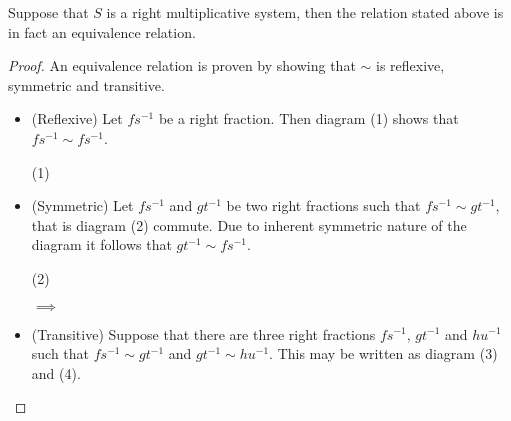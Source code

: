     \begin{prop}
        Suppose that $S$ is a right multiplicative system, then the relation stated above is in fact an equivalence relation.
    \end{prop}

    \begin{proof}
        An equivalence relation is proven by showing that $\sim$ is reflexive, symmetric and transitive.
        \begin{itemize}
            \item (Reflexive) Let $fs^{-1}$ be a right fraction. Then diagram (1) shows that $fs^{-1}\sim fs^{-1}$.
            \begin{center} (1)
            \end{center}
            \item (Symmetric) Let $fs^{-1}$ and $gt^{-1}$ be two right fractions such that $fs^{-1}\sim gt^{-1}$, that is diagram (2) commute. Due to inherent symmetric nature of the diagram it follows that $gt^{-1}\sim fs^{-1}$.
            \begin{center} (2)
                $\implies$
            \end{center}
            \item (Transitive) Suppose that there are three right fractions $fs^{-1}$, $gt^{-1}$ and $hu^{-1}$ such that $fs^{-1}\sim gt^{-1}$ and $gt^{-1}\sim hu^{-1}$. This may be written as diagram (3) and (4).

\end{itemize}
\end{proof}
